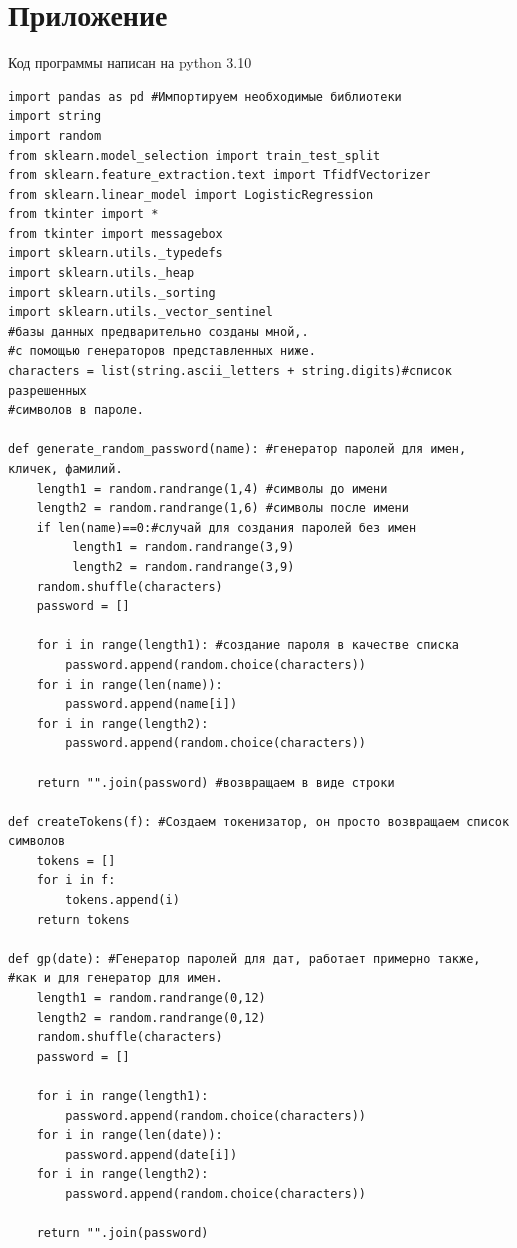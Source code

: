 \documentclass[a4paper,12pt]{article}
\begin{document}
\section{Приложение}
Код программы написан на python 3.10\\
\begin{verbatim}
import pandas as pd #Импортируем необходимые библиотеки
import string
import random
from sklearn.model_selection import train_test_split
from sklearn.feature_extraction.text import TfidfVectorizer
from sklearn.linear_model import LogisticRegression 
from tkinter import *  
from tkinter import messagebox
import sklearn.utils._typedefs
import sklearn.utils._heap
import sklearn.utils._sorting
import sklearn.utils._vector_sentinel
#базы данных предварительно созданы мной,.
#с помощью генераторов представленных ниже.
characters = list(string.ascii_letters + string.digits)#список разрешенных 
#символов в пароле.

def generate_random_password(name): #генератор паролей для имен, кличек, фамилий.
    length1 = random.randrange(1,4) #символы до имени
    length2 = random.randrange(1,6) #символы после имени
    if len(name)==0:#случай для создания паролей без имен
         length1 = random.randrange(3,9)
         length2 = random.randrange(3,9)
    random.shuffle(characters) 
    password = []
    
    for i in range(length1): #создание пароля в качестве списка
        password.append(random.choice(characters))
    for i in range(len(name)):
        password.append(name[i])
    for i in range(length2):
        password.append(random.choice(characters))

    return "".join(password) #возвращаем в виде строки

def createTokens(f): #Cоздаем токенизатор, он просто возвращаем список символов
    tokens = []
    for i in f:
        tokens.append(i)
    return tokens

def gp(date): #Генератор паролей для дат, работает примерно также, 
#как и для генератор для имен.
    length1 = random.randrange(0,12)
    length2 = random.randrange(0,12)
    random.shuffle(characters)
    password = []
    
    for i in range(length1):
        password.append(random.choice(characters))
    for i in range(len(date)):
        password.append(date[i])
    for i in range(length2):
        password.append(random.choice(characters))

    return "".join(password)


\end{verbatim}
\end{document}
